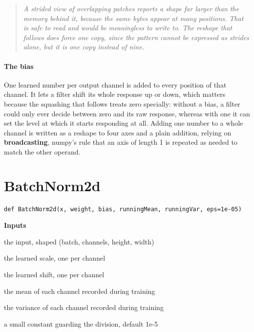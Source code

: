 \begin{quote}\small\itshape A strided view of overlapping patches reports a shape far larger than the memory behind it, because the same bytes appear at many positions. That is safe to read and would be meaningless to write to. The reshape that follows does force one copy, since the pattern cannot be expressed as strides alone, but it is one copy instead of nine.\end{quote}

\paragraph{The bias}
One learned number per output channel is added to every position of that channel. It lets a filter shift its whole response up or down, which matters because the squashing that follows treats zero specially: without a bias, a filter could only ever decide between zero and its raw response, whereas with one it can set the level at which it starts responding at all. Adding one number to a whole channel is written as a reshape to four axes and a plain addition, relying on \textbf{broadcasting}, numpy's rule that an axis of length 1 is repeated as needed to match the other operand.


\section{BatchNorm2d}
\begin{lstlisting}[style=sig]
def BatchNorm2d(x, weight, bias, runningMean, runningVar, eps=1e-05)
\end{lstlisting}

\noindent\textbf{Inputs}
\begin{description}[leftmargin=2.2em,style=nextline,font=\normalfont\ttfamily]\setlength\itemsep{1pt}
  \item[{x}] \normalfont the input, shaped (batch, channels, height, width)
  \item[{weight}] \normalfont the learned scale, one per channel
  \item[{bias}] \normalfont the learned shift, one per channel
  \item[{runningMean}] \normalfont the mean of each channel recorded during training
  \item[{runningVar}] \normalfont the variance of each channel recorded during training
  \item[{eps}] \normalfont a small constant guarding the division, default 1e-5
\end{description}

